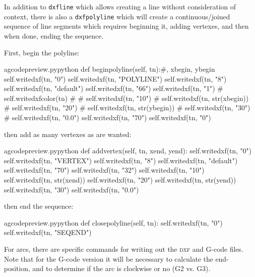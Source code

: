 \documentclass{ltxdoc}
\begin{document}
In addition to \verb|dxfline| which allows creating a line without consideration of context, there is also a \verb|dxfpolyline| which will create a continuous/joined sequence of line segments which requires beginning it, adding vertexes, and then when done, ending the sequence.

First, begin the polyline:

\lstset{firstnumber=\thegcpy}
\begin{writecode}{a}{gcodepreview.py}{python}
    def beginpolyline(self, tn):#, xbegin, ybegin
        self.writedxf(tn, "0")
        self.writedxf(tn, "POLYLINE")
        self.writedxf(tn, "8")
        self.writedxf(tn, "default")
        self.writedxf(tn, "66")
        self.writedxf(tn, "1")
#
        self.writedxfcolor(tn)
#
#        self.writedxf(tn, "10")
#        self.writedxf(tn, str(xbegin))
#        self.writedxf(tn, "20")
#        self.writedxf(tn, str(ybegin))
#        self.writedxf(tn, "30")
#        self.writedxf(tn, "0.0")
        self.writedxf(tn, "70")
        self.writedxf(tn, "0")

\end{writecode}
\addtocounter{gcpy}{18}

\noindent then add as many vertexes as are wanted:

\begin{writecode}{a}{gcodepreview.py}{python}
    def addvertex(self, tn, xend, yend):
        self.writedxf(tn, "0")
        self.writedxf(tn, "VERTEX")
        self.writedxf(tn, "8")
        self.writedxf(tn, "default")
        self.writedxf(tn, "70")
        self.writedxf(tn, "32")
        self.writedxf(tn, "10")
        self.writedxf(tn, str(xend))
        self.writedxf(tn, "20")
        self.writedxf(tn, str(yend))
        self.writedxf(tn, "30")
        self.writedxf(tn, "0.0")

\end{writecode}
\addtocounter{gcpy}{14}

\noindent then end the sequence:

\begin{writecode}{a}{gcodepreview.py}{python}
    def closepolyline(self, tn):
        self.writedxf(tn, "0")
        self.writedxf(tn, "SEQEND")

\end{writecode}
\addtocounter{gcpy}{4}

For arcs, there are specific commands for writing out the \textsc{dxf} and G-code files. Note that for the G-code version it will be necessary to calculate the end-position, and to determine if the arc is clockwise or no (G2 vs. G3).
\end{document}
